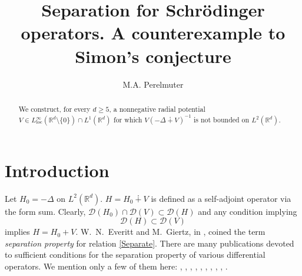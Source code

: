 \documentclass[11pt,reqno]{amsart}
\newcommand{\R}{{\mathbb R}}
\begin{document}
\title{Separation for Schr\"odinger operators. A counterexample to Simon's conjecture}
\author{M.A. Perelmuter}
\address{SCAD Soft Ltd., 3a Osvity Street, Kyiv, 03037, Ukraine}

\begin{abstract}
We construct, for every $d\ge 5$, a nonnegative radial potential
$V\in L^\infty_{\mathrm{loc}}(\mathbb{R}^d\setminus\{0\})\cap L^1(\mathbb{R}^d)$ for which
$V(-\Delta\dotplus V)^{-1}$ is not bounded on $L^2(\R^d)$.
\end{abstract}

\maketitle
\section{Introduction}
Let $H_0=-\Delta$ on $L^2(\R^d)$. $H=H_0\dotplus V$ is defined as a self-adjoint operator via the form sum.
Clearly, $\mathcal{D}(H_0)\cap \mathcal{D}(V) \subset \mathcal{D}(H)$ and any condition implying
\begin{equation}\label{Separate}
\mathcal{D}(H) \subset \mathcal{D}(V)
\end{equation}
implies $H=H_0+V$. W.~N.~Everitt and M.~Giertz, in \cite{Ever}, coined the term {\it separation property} for relation \eqref{Separate}.
There are many publications devoted to sufficient conditions for the separation property of various differential operators. We mention only a few of them here: \cite{Ever}, \cite{Ever73}, \cite{Ever77}, \cite{Davies}, \cite{Davies2}, \cite{Otelbaev}, \cite{Kalf}, \cite{Okazawa},  \cite{GS}, \cite{MS}.
\end{document}
